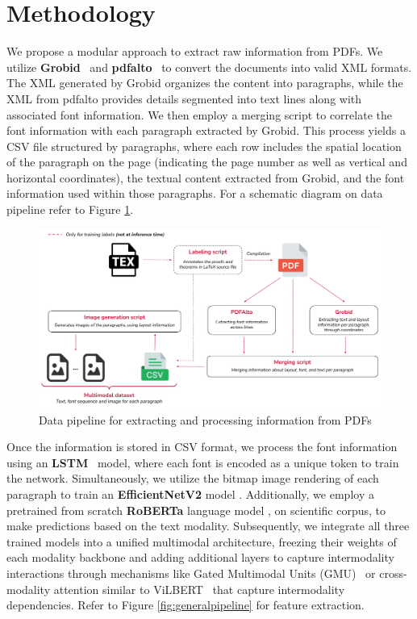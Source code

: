 \documentclass[runningheads]{llncs}
\begin{document}
\section{Methodology}
We propose a modular approach to extract raw information from PDFs. We utilize \textbf{Grobid}~\cite{GROBID} and \textbf{pdfalto}~\cite{pdfalto} to convert
the documents into valid XML formats. The XML generated by Grobid organizes the content into paragraphs,
while the XML from pdfalto provides details segmented into text lines along with associated font information.
We then employ a merging script to correlate the font information with each paragraph extracted by Grobid.
This process yields a CSV file structured by paragraphs, where each row includes the spatial location of the
paragraph on the page (indicating the page number as well as vertical and horizontal coordinates), the textual content
extracted from Grobid, and the font information used within those paragraphs. For a schematic diagram on data pipeline
refer to Figure \ref{fig:datapipeline}.

\begin{figure}[h]
	\centering
	\includegraphics[width=.9\textwidth]{images/preprocessing.pdf}
	\caption{Data pipeline for extracting and processing information from PDFs}
	\label{fig:datapipeline}
\end{figure}

Once the information is stored in CSV format, we process the font information using an \textbf{LSTM}~\cite{hochreiter1997long} model, where
each font is encoded as a unique token to train the network. Simultaneously, we utilize the bitmap image
rendering of each paragraph to train an \textbf{EfficientNetV2} model \cite{efficientnet}. Additionally, we employ a pretrained from scratch \textbf{RoBERTa} language model \cite{mishra:tel-04665528},
on scientific corpus, to make predictions based on the text modality. Subsequently, we
integrate all three trained models into a unified multimodal architecture, freezing their weights of each modality backbone and adding
additional layers to capture intermodality interactions through mechanisms like Gated Multimodal Units
(GMU)~\cite{arevalo2020gated} or cross-modality attention similar to ViLBERT~\cite{DBLP:conf/nips/LuBPL19} that capture intermodality dependencies. Refer to Figure \ref{fig:generalpipeline} for feature extraction.
\end{document}
